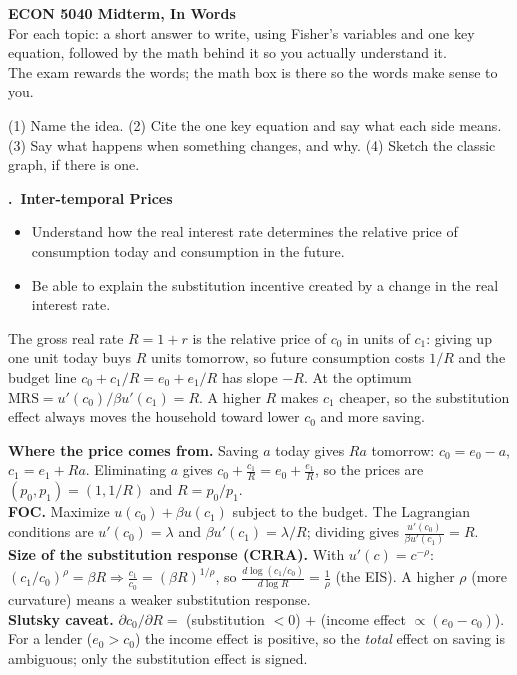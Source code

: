 \documentclass[11pt]{article}
\newcounter{qn}
\newcommand{\question}[1]{\par\needspace{14\baselineskip}\refstepcounter{qn}\medskip
{\bfseries\color{ink}\large \theqn.\ #1}\par\smallskip}
\begin{document}

\begin{center}
{\LARGE\bfseries\color{ink} ECON 5040 Midterm, In Words}\\[3pt]
{\small For each topic: a short answer to write, using Fisher's variables and one key equation, followed by the math behind it so you actually understand it.\\
The exam rewards the words; the math box is there so the words make sense to you.}
\end{center}

\begin{tcolorbox}[colback=warm,colframe=key,boxrule=0.6pt,arc=2pt,title={\bfseries\small The recipe for every answer},fonttitle=\small]
\small (1) Name the idea. (2) Cite the one key equation and say what each side means. (3) Say what happens when something changes, and why. (4) Sketch the classic graph, if there is one.
\end{tcolorbox}

\question{Inter-temporal Prices}
\begin{itemize}[leftmargin=1.2em,itemsep=0pt]\itshape
\item Understand how the real interest rate determines the relative price of consumption today and consumption in the future.
\item Be able to explain the substitution incentive created by a change in the real interest rate.
\end{itemize}

\begin{resp}
The gross real rate $R=1+r$ is the relative price of $c_0$ in units of $c_1$: giving up one unit today buys $R$ units tomorrow, so future consumption costs $1/R$ and the budget line $c_0+c_1/R=e_0+e_1/R$ has slope $-R$. At the optimum $\text{MRS}=u'(c_0)/\beta u'(c_1)=R$. A higher $R$ makes $c_1$ cheaper, so the substitution effect always moves the household toward lower $c_0$ and more saving.
\end{resp}
\begin{intu}
\textbf{Where the price comes from.} Saving $a$ today gives $Ra$ tomorrow: $c_0=e_0-a$, $c_1=e_1+Ra$. Eliminating $a$ gives $c_0+\frac{c_1}{R}=e_0+\frac{e_1}{R}$, so the prices are $(p_0,p_1)=(1,1/R)$ and $R=p_0/p_1$.\\
\textbf{FOC.} Maximize $u(c_0)+\beta u(c_1)$ subject to the budget. The Lagrangian conditions are $u'(c_0)=\lambda$ and $\beta u'(c_1)=\lambda/R$; dividing gives $\frac{u'(c_0)}{\beta u'(c_1)}=R$.\\
\textbf{Size of the substitution response (CRRA).} With $u'(c)=c^{-\rho}$: $(c_1/c_0)^{\rho}=\beta R\Rightarrow \frac{c_1}{c_0}=(\beta R)^{1/\rho}$, so $\frac{d\log(c_1/c_0)}{d\log R}=\frac1\rho$ (the EIS). A higher $\rho$ (more curvature) means a weaker substitution response.\\
\textbf{Slutsky caveat.} $\partial c_0/\partial R=$ (substitution $<0$) $+$ (income effect $\propto (e_0-c_0)$). For a lender ($e_0>c_0$) the income effect is positive, so the \emph{total} effect on saving is ambiguous; only the substitution effect is signed.
\end{intu}
\end{document}
